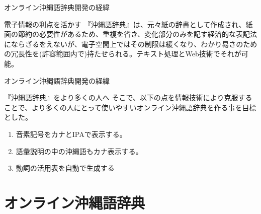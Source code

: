 \documentclass[14pt]{beamer}
\begin{document}
\begin{frame}{オンライン沖縄語辞典開発の経緯}
  \begin{block}{電子情報の利点を活かす}
    \vspace{0pt}
    『沖縄語辞典』は、元々紙の辞書として作成され、紙面の節約の必要性があるため、重複を省き、変化部分のみを記す経済的な表記法にならざるをえないが、電子空間上ではその制限は緩くなり、わかり易さのための冗長性を(許容範囲内で)持たせられる。テキスト処理とWeb技術でそれが可能。
  \end{block}
\end{frame}

\begin{frame}{オンライン沖縄語辞典開発の経緯}
  \begin{block}{『沖縄語辞典』をより多くの人へ}
    \vspace{0pt}
    そこで、以下の点を情報技術により克服することで、より多くの人にとって使いやすいオンライン沖縄語辞典を作る事を目標とした。
    \begin{enumerate}
    \item 音素記号をカナとIPAで表示する。
    \item 語彙説明の中の沖縄語もカナ表示する。
    \item 動詞の活用表を自動で生成する
    \end{enumerate}
  \end{block}
\end{frame}

\section{オンライン沖縄語辞典}

\end{document}
